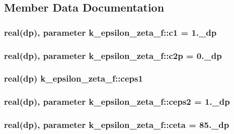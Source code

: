 \subsection{Member Data Documentation}
\hypertarget{classk__epsilon__zeta__f_a45bedddf115b58d59169d1da64d873eb}{
\subsubsection[{c1}]{\setlength{\rightskip}{0pt plus 5cm}real(dp), parameter k\-\_\-epsilon\-\_\-zeta\-\_\-f\-::c1 = 1.\-\_\-dp}}\label{classk__epsilon__zeta__f_a45bedddf115b58d59169d1da64d873eb}
\hypertarget{classk__epsilon__zeta__f_af3e889088961660782f1a7e4406edee3}{
\subsubsection[{c2p}]{\setlength{\rightskip}{0pt plus 5cm}real(dp), parameter k\-\_\-epsilon\-\_\-zeta\-\_\-f\-::c2p = 0.\-\_\-dp}}\label{classk__epsilon__zeta__f_af3e889088961660782f1a7e4406edee3}
\hypertarget{classk__epsilon__zeta__f_a424dc1473dde87fac65394097c5a045f}{
\subsubsection[{ceps1}]{\setlength{\rightskip}{0pt plus 5cm}real(dp) k\-\_\-epsilon\-\_\-zeta\-\_\-f\-::ceps1}}\label{classk__epsilon__zeta__f_a424dc1473dde87fac65394097c5a045f}
\hypertarget{classk__epsilon__zeta__f_a9ebcc0eb612e02b54b59ef242fb0c21c}{
\subsubsection[{ceps2}]{\setlength{\rightskip}{0pt plus 5cm}real(dp), parameter k\-\_\-epsilon\-\_\-zeta\-\_\-f\-::ceps2 = 1.\-\_\-dp}}\label{classk__epsilon__zeta__f_a9ebcc0eb612e02b54b59ef242fb0c21c}
\hypertarget{classk__epsilon__zeta__f_a93538d3314d49ba78d1b3ee314805659}{
\subsubsection[{ceta}]{\setlength{\rightskip}{0pt plus 5cm}real(dp), parameter k\-\_\-epsilon\-\_\-zeta\-\_\-f\-::ceta = 85.\-\_\-dp}}\label{classk__epsilon__zeta__f_a93538d3314d49ba78d1b3ee314805659}
